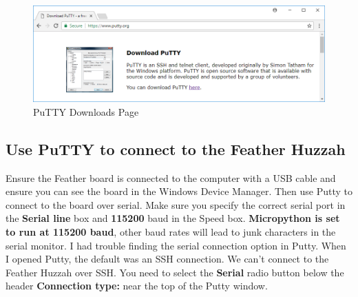 \documentclass{book}
\makeatletter
\def\maxwidth{\ifdim\Gin@nat@width>\linewidth\linewidth
    \else\Gin@nat@width\fi}
\let\Oldincludegraphics\includegraphics
\renewcommand{\includegraphics}[1]{\Oldincludegraphics[width=.8\maxwidth]{#1}}
\makeatother
\begin{document}
\begin{figure}
\centering
\includegraphics{images/download_putty.PNG}
\caption{PuTTY Downloads Page}
\end{figure}

    \subsection{Use PuTTY to connect to the Feather
Huzzah}\label{use-putty-to-connect-to-the-feather-huzzah}

    Ensure the Feather board is connected to the computer with a USB cable
and ensure you can see the board in the Windows Device Manager. Then use
Putty to connect to the board over serial. Make sure you specify the
correct serial port in the \textbf{Serial line} box and \textbf{115200}
baud in the Speed box. \textbf{Micropython is set to run at 115200
baud}, other baud rates will lead to junk characters in the serial
monitor. I had trouble finding the serial connection option in Putty.
When I opened Putty, the default was an SSH connection. We can't connect
to the Feather Huzzah over SSH. You need to select the \textbf{Serial}
radio button below the header \textbf{Connection type:} near the top of
the Putty window.
\end{document}
